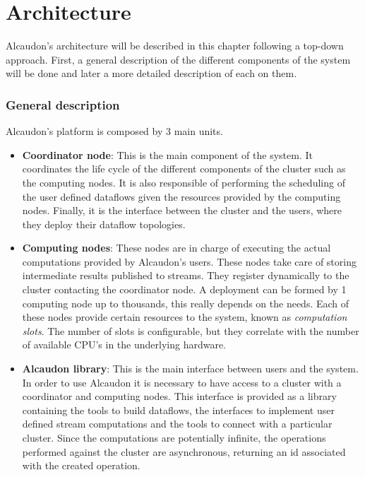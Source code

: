 \chapter{Architecture}
\label{chapter:architecture}

Alcaudon's architecture will be described in this chapter following a top-down
approach. First, a general description of the different components of the system
will be done and later a more detailed description of each on them.

\subsection{General description}

Alcaudon's platform is composed by 3 main units.

\begin{itemize}
\item \textbf{Coordinator node}: This is the main component of the system. It
  coordinates the life cycle of the different components of the cluster such as
  the computing nodes. It is also responsible of performing the scheduling of
  the user defined dataflows given the resources provided by the computing
  nodes. Finally, it is the interface between the cluster and the users, where
  they deploy their dataflow topologies.

\item \textbf{Computing nodes}: These nodes are in charge of executing the
  actual computations provided by Alcaudon's users. These nodes take care of
  storing intermediate results published to streams. They register dynamically
  to the cluster contacting the coordinator node. A deployment can be formed by
  1 computing node up to thousands, this really depends on the needs. Each of
  these nodes provide certain resources to the system, known as
  \textit{computation slots}. The number of slots is configurable, but they
  correlate with the number of available CPU's in the underlying hardware.

\item \textbf{Alcaudon library}: This is the main interface between users
  and the system. In order to use Alcaudon it is necessary to have access to a
  cluster with a coordinator and computing nodes. This interface is provided as
  a library containing the tools to build dataflows, the interfaces to implement
  user defined stream computations and the tools to connect with a particular
  cluster. Since the computations are potentially infinite, the operations
  performed against the cluster are asynchronous, returning an id associated
  with the created operation.
\end{itemize}

